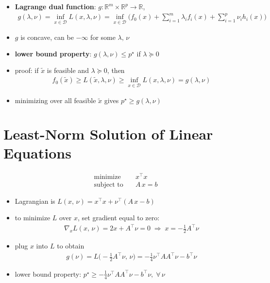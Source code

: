 \documentclass[11pt]{extarticle}
\newcommand{\ds}{\displaystyle}
\newcommand{\ie}{\;\Longrightarrow\;}
\theoremstyle{definition}
\begin{document}
\begin{itemize}
  \item {\bf Lagrange dual function}: $g:\mathbb{R}^m\times\mathbb{R}^p\to\mathbb{R}$, 
    \begin{align*}
      g(\lambda,\nu) =\inf_{x\in\mathcal{D}}L(x,\lambda,\nu) = \inf_{x\in\mathcal{D}}\bigg(f_0(x) + \sum_{i=1}^m\lambda_i f_i(x) + \sum_{i=1}^p\nu_i h_i(x)\bigg)
    \end{align*}
  \item $g$ is concave, can be $-\infty$ for some $\lambda,\,\nu$
  \item {\bf lower bound property}: $g(\lambda,\nu) \leqslant p^\star$ if $\lambda\succcurlyeq 0$
  \item proof: if $\ds\widetilde{x}$ is feasible and $\lambda\succcurlyeq 0$, then
    \begin{align*}
      f_0(\widetilde{x})\geqslant L(\widetilde{x},\lambda,\nu)\geqslant\inf_{x\in\mathcal{D}}L(x,\lambda,\nu) = g(\lambda,\nu)
    \end{align*}
  \item minimizing over all feasible $\ds\widetilde{x}$ gives $\ds p^\star\geqslant g(\lambda,\nu)$
\end{itemize}

\newpage

\section*{Least-Norm Solution of Linear Equations}
\begin{align*}
  \text{minimize}\quad & x^\top x \\
  \text{subject to}\quad & A\,x = b
\end{align*}
\begin{itemize}
  \item Lagrangian is $\ds L(x,\,\nu) = x^\top x + \nu^\top(A\,x - b)$
  \item to minimize $L$ over $x$, set gradient equal to zero:
    \begin{align*}
      \nabla_x L(x,\,\nu) = 2 x + A^\top\nu = 0\ie x = -\frac{1}{2}A^\top\nu
    \end{align*}
  \item plug $x$ into $L$ to obtain
    \begin{align*}
      g(\nu) = L\Big(-\frac{1}{2}A^\top\nu,\,\nu\Big) = -\frac{1}{4}\nu^\top AA^\top\nu - b^\top\nu
    \end{align*}
  \item lower bound property: $\ds p^\star\geqslant -\frac{1}{4}\nu^\top AA^\top\nu - b^\top\nu,\;\forall\,\nu$
\end{itemize}
\end{document}
